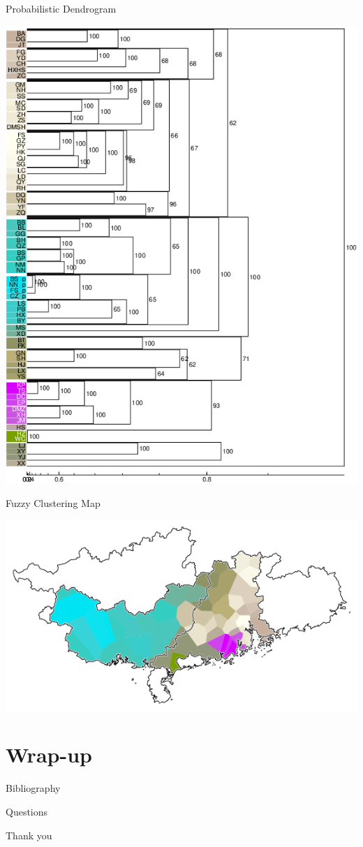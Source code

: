 \documentclass[presentation]{beamer}
\begin{document}
\begin{frame}[label={sec:org6e2e9fd}]{Probabilistic Dendrogram}
\begin{center}
\includegraphics[angle=90,width=.9\linewidth]{prob.png}
\end{center}
\end{frame}
\begin{frame}[label={sec:org60275c4}]{Fuzzy Clustering Map}
\begin{center}
\includegraphics[width=.9\linewidth]{ccc.png}
\end{center}
\end{frame}

\section{Wrap-up}
\label{sec:org732de4c}
\begin{frame}[allowframebreaks,label=]{Bibliography}
\printbibliography[heading=none]
\end{frame}
\begin{frame}[label={sec:org14946a1}]{Questions}
\end{frame}
\begin{frame}[label={sec:org9e136a9}]{Thank you}
\end{frame}
\end{document}
